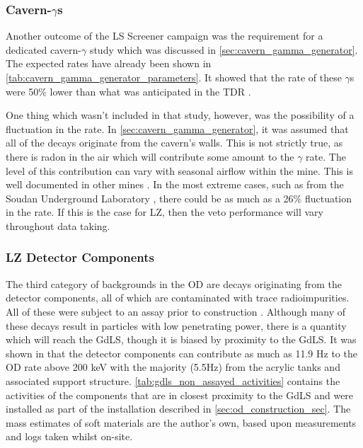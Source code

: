 


\subsubsection{Cavern-$\gamma$s}
\par
Another outcome of the LS Screener campaign was the requirement for a dedicated cavern-$\gamma$ study which was discussed in \autoref{sec:cavern_gamma_generator}.
The expected rates have already been shown in \autoref{tab:cavern_gamma_generator_parameters}.
It showed that the rate of these $\gamma$s were 50\% lower than what was anticipated in the TDR \cite{LZ_TechnicalDesignReview_ref}.
\par
One thing which wasn't included in that study, however, was the possibility of a fluctuation in the rate.
In \autoref{sec:cavern_gamma_generator}, it was assumed that all of the decays originate from the cavern's walls.
This is not strictly true, as there is radon in the air which will contribute some amount to the $\gamma$ rate.
The level of this contribution can vary with seasonal airflow within the mine.
This is well documented in other mines \cite{finnish_mine_radon_ref,nepal_mine_radon_ref,minos_annual_modulation_ref}.
In the most extreme cases, such as from the Soudan Underground Laboratory \cite{cavern_gammas_in_Soudan_mine_ref}, there could be as much as a 26\% fluctuation in the rate.
If this is the case for LZ, then the veto performance will vary throughout data taking.

\subsubsection{LZ Detector Components}
\par
The third category of backgrounds in the OD are decays originating from the detector components, all of which are contaminated with trace radioimpurities.
All of these were subject to an assay prior to construction \cite{LZ_assay_ref}.
Although many of these decays result in particles with low penetrating power, there is a quantity which will reach the GdLS, though it is biased by proximity to the GdLS.
It was shown in \cite{scotthaselschwardt_thesis_ref} that the detector components can contribute as much as 11.9 Hz to the OD rate above 200 keV with the majority (5.5Hz) from the acrylic tanks and associated support structure.
\autoref{tab:gdls_non_assayed_activities} contains the activities of the components that are in closest proximity to the GdLS and were installed as part of the installation described in \autoref{sec:od_construction_sec}.
The mass estimates of soft materials are the author's own, based upon measurements and logs taken whilst on-site.

